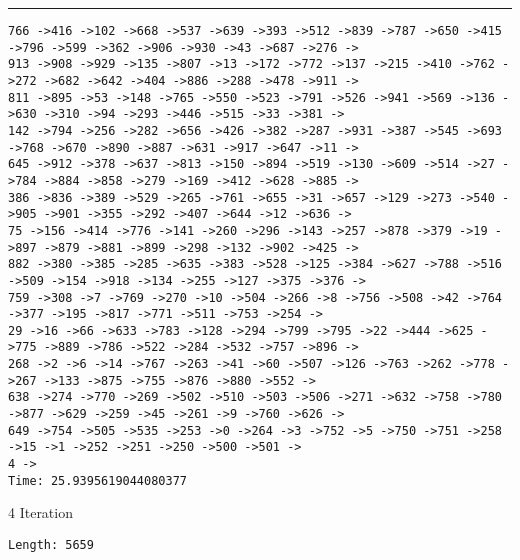 \documentclass[letter, 12pt]{article}
\newenvironment{question}[1]{%
    \vspace{.2in}%
        \noindent{\bf #1}%
    \vspace{0.3em} \hrule \vspace{.1in}%
}{}
\begin{document}
\begin{question}{\large Appendix}
\begin{lstlisting}[style=CStyle]
766 ->416 ->102 ->668 ->537 ->639 ->393 ->512 ->839 ->787 ->650 ->415 ->796 ->599 ->362 ->906 ->930 ->43 ->687 ->276 ->
913 ->908 ->929 ->135 ->807 ->13 ->172 ->772 ->137 ->215 ->410 ->762 ->272 ->682 ->642 ->404 ->886 ->288 ->478 ->911 ->
811 ->895 ->53 ->148 ->765 ->550 ->523 ->791 ->526 ->941 ->569 ->136 ->630 ->310 ->94 ->293 ->446 ->515 ->33 ->381 ->
142 ->794 ->256 ->282 ->656 ->426 ->382 ->287 ->931 ->387 ->545 ->693 ->768 ->670 ->890 ->887 ->631 ->917 ->647 ->11 ->
645 ->912 ->378 ->637 ->813 ->150 ->894 ->519 ->130 ->609 ->514 ->27 ->784 ->884 ->858 ->279 ->169 ->412 ->628 ->885 ->
386 ->836 ->389 ->529 ->265 ->761 ->655 ->31 ->657 ->129 ->273 ->540 ->905 ->901 ->355 ->292 ->407 ->644 ->12 ->636 ->
75 ->156 ->414 ->776 ->141 ->260 ->296 ->143 ->257 ->878 ->379 ->19 ->897 ->879 ->881 ->899 ->298 ->132 ->902 ->425 ->
882 ->380 ->385 ->285 ->635 ->383 ->528 ->125 ->384 ->627 ->788 ->516 ->509 ->154 ->918 ->134 ->255 ->127 ->375 ->376 ->
759 ->308 ->7 ->769 ->270 ->10 ->504 ->266 ->8 ->756 ->508 ->42 ->764 ->377 ->195 ->817 ->771 ->511 ->753 ->254 ->
29 ->16 ->66 ->633 ->783 ->128 ->294 ->799 ->795 ->22 ->444 ->625 ->775 ->889 ->786 ->522 ->284 ->532 ->757 ->896 ->
268 ->2 ->6 ->14 ->767 ->263 ->41 ->60 ->507 ->126 ->763 ->262 ->778 ->267 ->133 ->875 ->755 ->876 ->880 ->552 ->
638 ->274 ->770 ->269 ->502 ->510 ->503 ->506 ->271 ->632 ->758 ->780 ->877 ->629 ->259 ->45 ->261 ->9 ->760 ->626 ->
649 ->754 ->505 ->535 ->253 ->0 ->264 ->3 ->752 ->5 ->750 ->751 ->258 ->15 ->1 ->252 ->251 ->250 ->500 ->501 ->
4 ->
Time: 25.9395619044080377
\end{lstlisting}


4 Iteration
\begin{lstlisting}[style=CStyle]
Length: 5659


\end{lstlisting}
\end{question}
\end{document}

